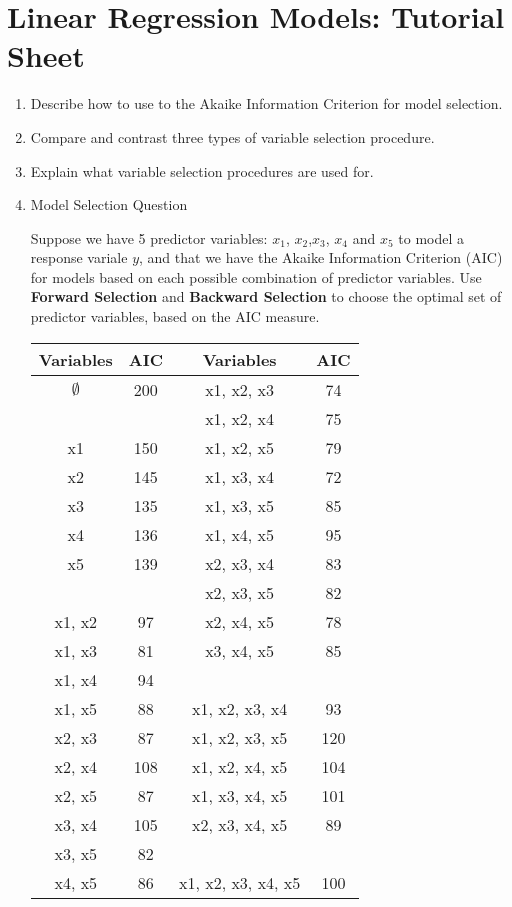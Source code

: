 \documentclass[a4paper,12pt]{article}
\begin{document}
	\section*{Linear Regression Models: Tutorial Sheet}
\begin{enumerate}

\item Describe how to use to the Akaike Information Criterion for model selection.
\item Compare and contrast three types of variable selection procedure.
\item Explain what variable selection procedures are used for.
	
\item Model Selection Question


Suppose we have 5 predictor variables: $x_1$, $x_2$,$x_3$, $x_4$ and $x_5$ to model a response variale $y$, and that we have the Akaike Information Criterion (AIC) for models based on each possible combination of predictor variables.
Use \textbf{Forward Selection} and \textbf{Backward Selection} to choose the optimal set of predictor variables, based on the AIC measure.

{
	\large
	\begin{center}
		\begin{tabular}{||c|c||c|c||}
			\hline
			Variables & AIC & Variables & AIC \\ \hline \hline
			$\emptyset$	&	200	&	x1, x2, x3	&	74	\\ \hline
			\phantom{makemakespace}
			&	\phantom{makespace}
			&	x1, x2, x4	&	75	\\ \hline
			x1	&	150	&	x1, x2, x5	&	79	\\ \hline
			x2	&	145	&	x1, x3, x4	&	72	\\ \hline
			x3	&	135	&	x1, x3, x5	&	85	\\ \hline
			x4	&	136	&	x1, x4, x5	&	95	\\ \hline
			x5	&	139	&	x2, x3, x4	&	83	\\ \hline
			&		&	x2, x3, x5	&	82	\\ \hline
			x1, x2	&	97	&	x2, x4, x5	&	78	\\ \hline
			x1, x3	&	81	&	x3, x4, x5	&	85	\\ \hline
			x1, x4	&	94	&	\phantom{makemakespace}
			&	\phantom{makespace}
			\\ \hline
			x1, x5	&	88	&	x1, x2, x3, x4	&	93	\\ \hline
			x2, x3	&	87	&	x1, x2, x3, x5	&	120	\\ \hline
			x2, x4	&	108	&	x1, x2, x4, x5	&	104	\\ \hline
			x2, x5	&	87	&	x1, x3, x4, x5	&	101	\\ \hline
			x3, x4	&	105	&	x2, x3, x4, x5	&	89	\\ \hline
			x3, x5	&	82	&		&		\\ \hline
			x4, x5	&	86	&	x1, x2, x3, x4, x5	&	100	\\ \hline
		\end{tabular} 
	\end{center}
}



\end{enumerate}
\end{document}
